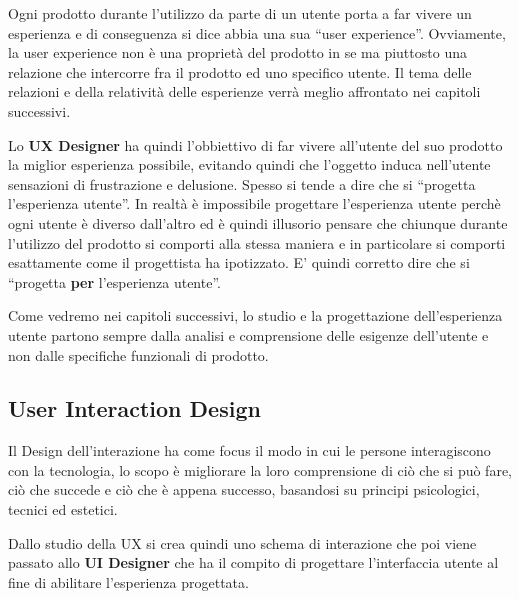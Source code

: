
Ogni prodotto durante l'utilizzo da parte di un utente porta a far vivere un esperienza e di conseguenza si dice abbia una sua ``user experience''. Ovviamente, la user experience non è una proprietà del prodotto in se ma piuttosto una relazione che intercorre fra il prodotto ed uno specifico utente. Il tema delle relazioni e della relatività delle esperienze verrà meglio affrontato nei capitoli successivi. 


Lo \textbf{UX Designer} ha quindi l'obbiettivo di far vivere all'utente del suo prodotto la miglior esperienza possibile, evitando quindi che l'oggetto induca nell'utente sensazioni di frustrazione e delusione.
Spesso si tende a dire che si ``progetta l'esperienza utente''. In realtà è impossibile progettare l'esperienza utente perchè ogni utente è diverso dall'altro ed è quindi illusorio pensare che chiunque durante l'utilizzo del prodotto si comporti alla stessa maniera e in particolare si comporti esattamente come il progettista ha ipotizzato.
E' quindi corretto dire che si ``progetta \textbf{per} l'esperienza utente''.

Come vedremo nei capitoli successivi, lo studio e la progettazione dell'esperienza utente partono sempre dalla analisi e comprensione delle esigenze dell'utente e non dalle specifiche funzionali di prodotto. 

\subsection{User Interaction Design}
Il Design dell'interazione ha come focus il modo in cui le persone interagiscono con la tecnologia, lo scopo è migliorare la loro comprensione di ciò che si può fare, ciò che succede e ciò che è appena successo, basandosi su principi psicologici, tecnici ed estetici.

Dallo studio della UX si crea quindi uno schema di interazione che poi viene passato allo \textbf{UI Designer} che ha il compito di progettare l'interfaccia utente al fine di abilitare l'esperienza progettata.

